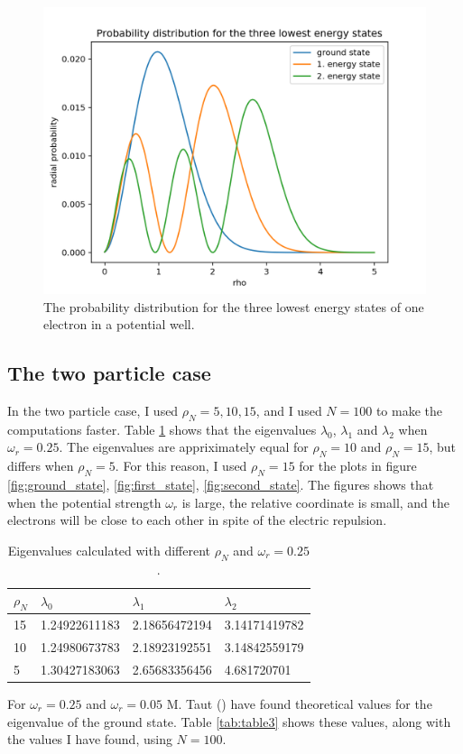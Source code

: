 \documentclass{article}
\begin{document}
\begin{figure}
  \includegraphics[width=\linewidth]{one_electron.png}
  \caption{The probability distribution for the three lowest energy states of one electron in a potential well.}
  \label{fig:one_electron}
\end{figure}

\subsection{The two particle case}
In the two particle case, I used $\rho_N=5,10,15$, and I used $N=100$ to make the computations faster. Table \ref{tab:table2} shows that the eigenvalues $\lambda_0$, $\lambda_1$ and $\lambda_2$ when $\omega_r =0.25$. The eigenvalues are appriximately equal for $\rho_N=10$ and $\rho_N=15$, but differs when $\rho_N=5$. For this reason, I used $\rho_N=15$ for the plots in figure \ref{fig:ground_state}, \ref{fig:first_state}, \ref{fig:second_state}. The figures shows that when the potential strength $\omega_r$ is large, the relative coordinate is small, and the electrons will be close to each other in spite of the electric repulsion. 

\begin{table}[h!]
  \centering
  \caption{Eigenvalues calculated with different $\rho_N$ and $\omega_r =0.25$.}
  \label{tab:table2}
  \begin{tabular}{l||l|l|l}
   $\rho_N$ & $\lambda_0$ & $\lambda_1$ & $\lambda_2$\\

    \hline
    15  & 1.24922611183 & 2.18656472194 & 3.14171419782 \\
    \hline
    10 & 1.24980673783 & 2.18923192551 & 3.14842559179 \\
    \hline
     5 & 1.30427183063 & 2.65683356456 & 4.681720701 \\

  \end{tabular}
\end{table}
For $\omega_r=0.25$ and $\omega_r=0.05$ M. Taut (\cite{Oscillatorfrequancies}) have found theoretical values for the eigenvalue of the ground state. Table \ref{tab:table3} shows these values, along with the values I have found, using $N=100$. 
\end{document}
